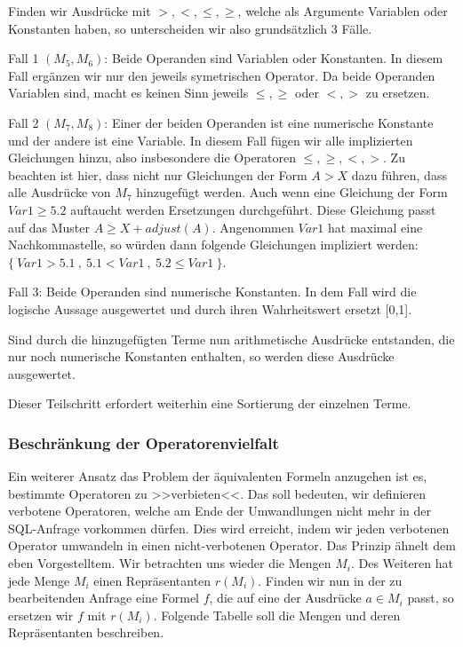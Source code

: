 Finden wir Ausdrücke mit $>,<,\leq,\geq$, welche als Argumente Variablen oder Konstanten haben, so unterscheiden wir also grundsätzlich 3 Fälle.

Fall 1 $(M_5,M_6)$: Beide Operanden sind Variablen oder Konstanten. In diesem Fall ergänzen wir nur den jeweils symetrischen Operator. Da beide Operanden Variablen sind, macht es keinen Sinn jeweils $\leq,\geq$ oder $<,>$ zu ersetzen.

Fall 2 $(M_7,M_8)$: Einer der beiden Operanden ist eine numerische Konstante und der andere ist eine Variable. In diesem Fall fügen wir alle implizierten Gleichungen hinzu, also insbesondere die Operatoren $\leq,\geq,<,>$. Zu beachten ist hier, dass nicht nur Gleichungen der Form $A>X$ dazu führen, dass alle Ausdrücke von $M_7$ hinzugefügt werden. Auch wenn eine Gleichung der Form $Var1\geq 5.2$ auftaucht werden Ersetzungen durchgeführt. Diese Gleichung passt auf das Muster $A\geq X+\mathit{adjust}(A)$. Angenommen $Var1$ hat maximal eine Nachkommastelle, so würden dann folgende Gleichungen impliziert werden: $\{\ Var1>5.1\ ,\ 5.1<Var1\ ,\ 5.2 \leq Var1\ \}$.

Fall 3: Beide Operanden sind numerische Konstanten. In dem Fall wird die logische Aussage ausgewertet und durch ihren Wahrheitswert ersetzt [0,1].

Sind durch die hinzugefügten Terme nun arithmetische Ausdrücke entstanden, die nur noch numerische Konstanten enthalten, so werden diese Ausdrücke ausgewertet.

Dieser Teilschritt erfordert weiterhin eine Sortierung der einzelnen Terme.

\subsubsection{Beschränkung der Operatorenvielfalt}

Ein weiterer Ansatz das Problem der äquivalenten Formeln anzugehen ist es, bestimmte Operatoren zu >>verbieten<<. Das soll bedeuten, wir definieren verbotene Operatoren, welche am Ende der Umwandlungen nicht mehr in der SQL-Anfrage vorkommen dürfen. Dies wird erreicht, indem wir jeden verbotenen Operator umwandeln in einen nicht-verbotenen Operator. Das Prinzip ähnelt dem eben Vorgestelltem. Wir betrachten uns wieder die Mengen $M_i$. Des Weiteren hat jede Menge $M_i$ einen Repräsentanten $r(M_i)$. Finden wir nun in der zu bearbeitenden Anfrage eine Formel $f$, die auf eine der Ausdrücke $a\in M_i$ passt, so ersetzen wir $f$ mit $r(M_i)$. Folgende Tabelle soll die Mengen und deren Repräsentanten beschreiben.

